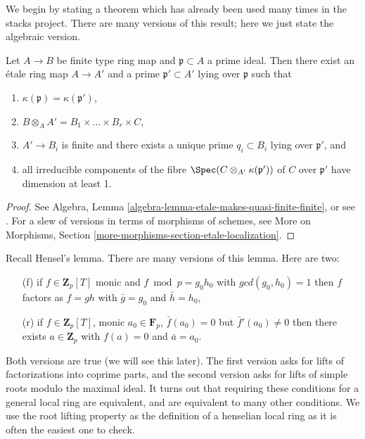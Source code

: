 \noindent
We begin by stating a theorem which has already been used many times
in the stacks project. There are many versions of this result; here we
just state the algebraic version.

\begin{theorem}
\label{theorem-quasi-finite-etale-locally}
Let $A\to B$ be finite type ring map and $\mathfrak p \subset A$ a prime
ideal. Then there exist an \'etale ring map $A \to A'$ and a prime
$\mathfrak p' \subset A'$ lying over $\mathfrak p$ such that
\begin{enumerate}
\item
$\kappa(\mathfrak p) = \kappa(\mathfrak p')$,
\item
$ B \otimes_A A' = B_1\times \ldots \times B_r \times C$,
\item
$ A'\to B_i$ is finite and there exists a unique prime $q_i\subset B_i$ lying
over $\mathfrak p'$, and
\item all irreducible components of the fibre
$\Spec(C \otimes_{A'} \kappa(\mathfrak p'))$ of $C$ over $\mathfrak p'$
have dimension at least 1.
\end{enumerate}
\end{theorem}

\begin{proof}
See Algebra, Lemma \ref{algebra-lemma-etale-makes-quasi-finite-finite}, or
see \cite[Th\'eor\`eme 18.12.1]{EGA4}. For a slew of versions in terms of
morphisms of schemes, see
More on Morphisms, Section \ref{more-morphisms-section-etale-localization}.
\end{proof}

\noindent
Recall Hensel's lemma.
There are many versions of this lemma. Here are two:
\begin{enumerate}
\item[(f)] if $f\in \mathbf{Z}_p[T]$ monic and
$f \bmod p = g_0 h_0$ with $gcd(g_0, h_0) = 1$ then $f$ factors
as $f = gh$ with $\bar g = g_0$ and $\bar h = h_0$,
\item[(r)] if $f \in \mathbf{Z}_p[T]$, monic $a_0 \in \mathbf{F}_p$,
$\bar f(a_0) =0$ but $\bar f'(a_0) \neq 0$
then there exists $a \in \mathbf{Z}_p$ with
$f(a) = 0$ and $\bar a = a_0$.
\end{enumerate}
Both versions are true (we will see this later). The first version
asks for lifts of factorizations into coprime parts,
and the second version asks for lifts of simple roots
modulo the maximal ideal. It turns out that requiring
these conditions for a general local ring are equivalent, and are
equivalent to many other conditions. We use the root lifting
property as the definition of a henselian local ring as it is
often the easiest one to check.

